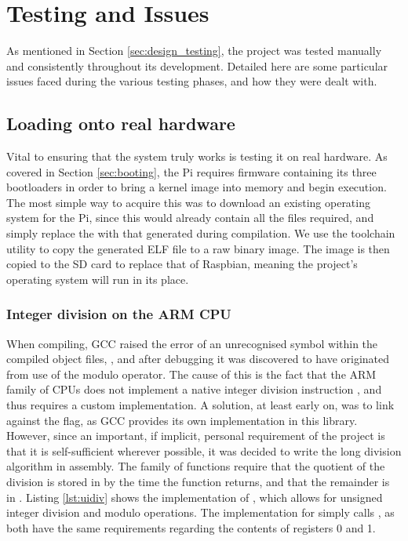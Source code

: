 \section{Testing and Issues}
    As mentioned in Section \ref{sec:design_testing}, the project was tested
    manually and consistently throughout its development. Detailed here are some
    particular issues faced during the various testing phases, and how they were
    dealt with.

\subsection{Loading onto real hardware}
    Vital to ensuring that the system truly works is testing it on real
    hardware. As covered in Section \ref{sec:booting}, the Pi requires firmware
    containing its three bootloaders in order to bring a kernel image into
    memory and begin execution. The most simple way to acquire this was to
    download an existing operating system for the Pi, since this would already
    contain all the files required, and simply replace the 
    with that generated during compilation. We use the toolchain utility
     to copy the generated ELF file to a raw binary
    image. The image is then copied to the SD card to replace that of Raspbian,
    meaning the project's operating system will run in its place.

\subsubsection{Integer division on the ARM CPU}
    When compiling, GCC raised the error of an unrecognised symbol within the
    compiled object files, , and after debugging it
    was discovered to have originated from use of the modulo operator. The cause
    of this is the fact that the ARM family of CPUs does not implement a native
    integer division instruction \cite{ARM_udiv}, and thus requires a custom
    implementation. A solution, at least early on, was to link against the
     flag, as GCC provides its own implementation in this library.
    However, since an important, if implicit, personal requirement of the
    project is that it is self-sufficient wherever possible, it was decided to
    write the long division algorithm in assembly. The 
    family of functions require that the quotient of the division is stored in
     by the time the function returns, and that the remainder is in
    . Listing \ref{lst:uidiv} shows the implementation of
    , which allows for unsigned
    integer division and modulo operations. The implementation for
     simply calls , as both
    have the same requirements regarding the contents of registers 0 and 1.
        
